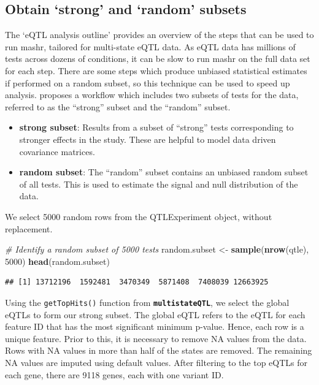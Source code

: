 \documentclass[
]{article}
\newenvironment{Shaded}{\begin{snugshade}}{\end{snugshade}}
\newcommand{\CommentTok}[1]{\textcolor[rgb]{0.56,0.35,0.01}{\textit{#1}}}
\newcommand{\DecValTok}[1]{\textcolor[rgb]{0.00,0.00,0.81}{#1}}
\newcommand{\FunctionTok}[1]{\textcolor[rgb]{0.13,0.29,0.53}{\textbf{#1}}}
\newcommand{\NormalTok}[1]{#1}
\newcommand{\OtherTok}[1]{\textcolor[rgb]{0.56,0.35,0.01}{#1}}
\providecommand{\tightlist}{%
  \setlength{\itemsep}{0pt}\setlength{\parskip}{0pt}}
\begin{document}
\hypertarget{obtain-strong-and-random-subsets}{%
\subsection{Obtain `strong' and `random'
subsets}\label{obtain-strong-and-random-subsets}}

The `eQTL analysis outline' provides an overview of the steps that can
be used to run mashr, tailored for multi-state eQTL data. As eQTL data
has millions of tests across dozens of conditions, it can be slow to run
mashr on the full data set for each step. There are some steps which
produce unbiased statistical estimates if performed on a random subset,
so this technique can be used to speed up analysis.
\textcite{Stephens_2023_eQTL} proposes a workflow which includes two
subsets of tests for the data, referred to as the ``strong'' subset and
the ``random'' subset.

\begin{itemize}
\tightlist
\item
  \textbf{strong subset}: Results from a subset of ``strong'' tests
  corresponding to stronger effects in the study. These are helpful to
  model data driven covariance matrices.
\item
  \textbf{random subset}: The ``random'' subset contains an unbiased
  random subset of all tests. This is used to estimate the signal and
  null distribution of the data.
\end{itemize}

We select 5000 random rows from the QTLExperiment object, without
replacement. \footnotesize

\begin{Shaded}
\begin{Highlighting}[]
\CommentTok{\# Identify a random subset of 5000 tests}
\NormalTok{random.subset }\OtherTok{\textless{}{-}} \FunctionTok{sample}\NormalTok{(}\FunctionTok{nrow}\NormalTok{(qtle), }\DecValTok{5000}\NormalTok{)}
\FunctionTok{head}\NormalTok{(random.subset)}
\end{Highlighting}
\end{Shaded}

\begin{verbatim}
## [1] 13712196  1592481  3470349  5871408  7408039 12663925
\end{verbatim}

\normalsize

Using the \texttt{getTopHits()} function from
\textbf{\texttt{multistateQTL}}, we select the global eQTLs to form our
strong subset. The global eQTL refers to the eQTL for each feature ID
that has the most significant minimum p-value. Hence, each row is a
unique feature. Prior to this, it is necessary to remove NA values from
the data. Rows with NA values in more than half of the states are
removed. The remaining NA values are imputed using default values. After
filtering to the top eQTLs for each gene, there are 9118 genes, each
with one variant ID.
\end{document}
